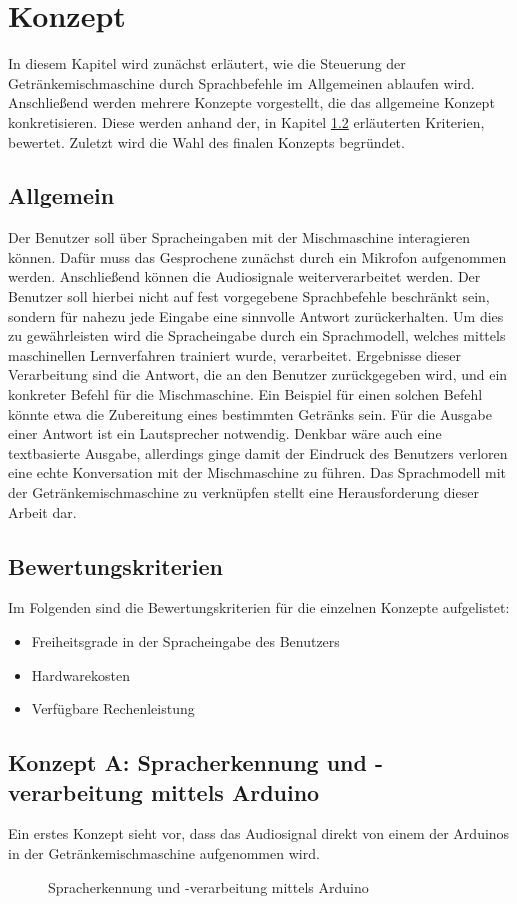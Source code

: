 \chapter{Konzept}
In diesem Kapitel wird zunächst erläutert, wie die Steuerung der Getränkemischmaschine durch Sprachbefehle im Allgemeinen ablaufen wird.
Anschließend werden mehrere Konzepte vorgestellt, die das allgemeine Konzept konkretisieren.
Diese werden anhand der, in Kapitel \ref{section:Bewertungskriterien} erläuterten Kriterien, bewertet.
Zuletzt wird die Wahl des finalen Konzepts begründet.
\section{Allgemein}
Der Benutzer soll über Spracheingaben mit der Mischmaschine interagieren können.
Dafür muss das Gesprochene zunächst durch ein Mikrofon aufgenommen werden.
Anschließend können die Audiosignale weiterverarbeitet werden.
Der Benutzer soll hierbei nicht auf fest vorgegebene Sprachbefehle beschränkt sein, sondern für nahezu jede Eingabe eine sinnvolle Antwort zurückerhalten.
Um dies zu gewährleisten wird die Spracheingabe durch ein Sprachmodell, welches mittels maschinellen Lernverfahren trainiert wurde, verarbeitet. 
Ergebnisse dieser Verarbeitung sind die Antwort, die an den Benutzer zurückgegeben wird, und ein konkreter Befehl für die Mischmaschine.
Ein Beispiel für einen solchen Befehl könnte etwa die Zubereitung eines bestimmten Getränks sein.
Für die Ausgabe einer Antwort ist ein Lautsprecher notwendig.
Denkbar wäre auch eine textbasierte Ausgabe, allerdings ginge damit der Eindruck des Benutzers verloren eine echte Konversation mit der Mischmaschine zu führen.
Das Sprachmodell mit der Getränkemischmaschine zu verknüpfen stellt eine Herausforderung dieser Arbeit dar.
\section{Bewertungskriterien} \label{section:Bewertungskriterien}
Im Folgenden sind die Bewertungskriterien für die einzelnen Konzepte aufgelistet:
\begin{itemize}
    \item Freiheitsgrade in der Spracheingabe des Benutzers
    \item Hardwarekosten
    \item Verfügbare Rechenleistung
\end{itemize}
\section{Konzept A: Spracherkennung und -verarbeitung mittels Arduino}
Ein erstes Konzept sieht vor, dass das Audiosignal direkt von einem der Arduinos in der Getränkemischmaschine aufgenommen wird.
\begin{figure}[H]
    \centering
    \caption{\label{figure:Spracherkennung_mittels_Arduino}Spracherkennung und -verarbeitung mittels Arduino}
\end{figure}
